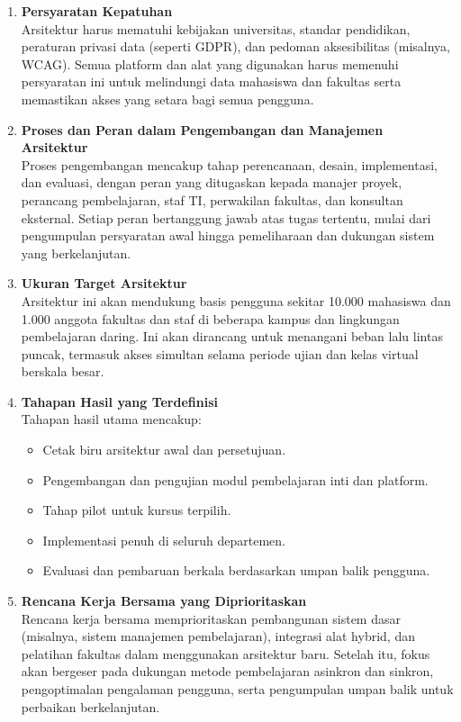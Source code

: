 \begin{enumerate}
	\item \textbf{Persyaratan Kepatuhan} \\
	Arsitektur harus mematuhi kebijakan universitas, standar pendidikan, peraturan privasi data (seperti GDPR), dan pedoman aksesibilitas (misalnya, WCAG). Semua platform dan alat yang digunakan harus memenuhi persyaratan ini untuk melindungi data mahasiswa dan fakultas serta memastikan akses yang setara bagi semua pengguna.
	
	\item \textbf{Proses dan Peran dalam Pengembangan dan Manajemen Arsitektur} \\
	Proses pengembangan mencakup tahap perencanaan, desain, implementasi, dan evaluasi, dengan peran yang ditugaskan kepada manajer proyek, perancang pembelajaran, staf TI, perwakilan fakultas, dan konsultan eksternal. Setiap peran bertanggung jawab atas tugas tertentu, mulai dari pengumpulan persyaratan awal hingga pemeliharaan dan dukungan sistem yang berkelanjutan.
	
	\item \textbf{Ukuran Target Arsitektur} \\
	Arsitektur ini akan mendukung basis pengguna sekitar 10.000 mahasiswa dan 1.000 anggota fakultas dan staf di beberapa kampus dan lingkungan pembelajaran daring. Ini akan dirancang untuk menangani beban lalu lintas puncak, termasuk akses simultan selama periode ujian dan kelas virtual berskala besar.
	
	\item \textbf{Tahapan Hasil yang Terdefinisi} \\
	Tahapan hasil utama mencakup:
	\begin{itemize}
		\item Cetak biru arsitektur awal dan persetujuan.
		\item Pengembangan dan pengujian modul pembelajaran inti dan platform.
		\item Tahap pilot untuk kursus terpilih.
		\item Implementasi penuh di seluruh departemen.
		\item Evaluasi dan pembaruan berkala berdasarkan umpan balik pengguna.
	\end{itemize}
	
	\item \textbf{Rencana Kerja Bersama yang Diprioritaskan} \\
	Rencana kerja bersama memprioritaskan pembangunan sistem dasar (misalnya, sistem manajemen pembelajaran), integrasi alat hybrid, dan pelatihan fakultas dalam menggunakan arsitektur baru. Setelah itu, fokus akan bergeser pada dukungan metode pembelajaran asinkron dan sinkron, pengoptimalan pengalaman pengguna, serta pengumpulan umpan balik untuk perbaikan berkelanjutan.
	

\end{enumerate}
